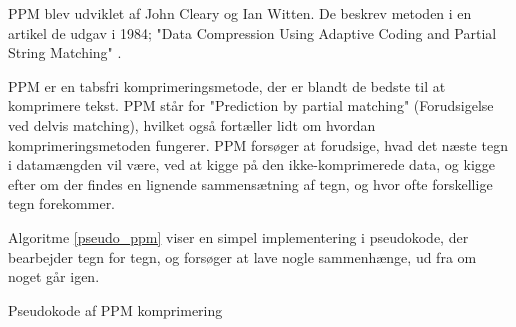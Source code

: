 PPM blev udviklet af John Cleary og Ian Witten. De beskrev metoden i en artikel de udgav i 1984; "Data Compression Using Adaptive Coding and Partial String Matching" \cite{Cleary84datacompression}.

PPM er en tabsfri komprimeringsmetode, der er blandt de bedste til at komprimere tekst. PPM står for "Prediction by partial matching" (Forudsigelse ved delvis matching), hvilket også fortæller lidt om hvordan komprimeringsmetoden fungerer. PPM forsøger at forudsige, hvad det næste tegn i datamængden vil være, ved at kigge på den ikke-komprimerede data, og kigge efter om der findes en lignende sammensætning af tegn, og hvor ofte forskellige tegn forekommer. 

Algoritme \ref{pseudo_ppm} viser en simpel implementering i pseudokode, der bearbejder tegn for tegn, og forsøger at lave nogle sammenhænge, ud fra om noget går igen. \cite{ppm_stringology}

\begin{algorithm}[H]
 \SetAlgoLined
\caption{Pseudokode af PPM komprimering \cite{ppm_stringology}}
\label{pseudo_ppm}
\end{algorithm}